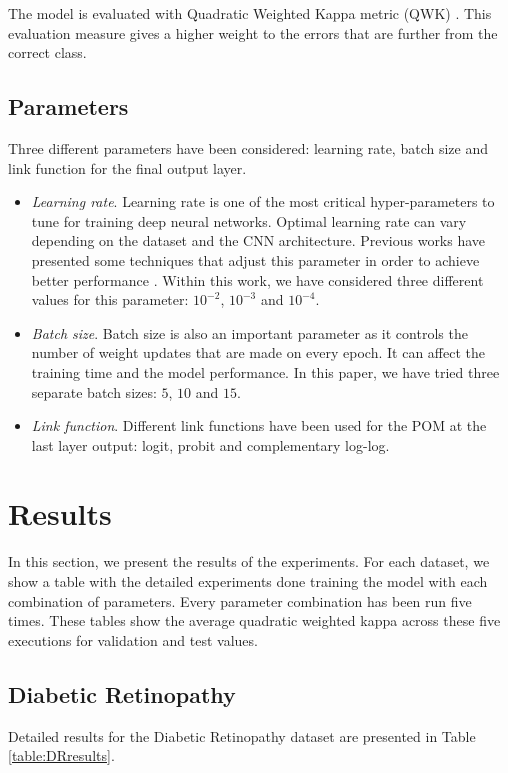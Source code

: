 \documentclass[10pt, a4paper, titlepage, twocolumn]{article}
\begin{document}
	The model is evaluated with Quadratic Weighted Kappa metric (QWK) \cite{ben2008comparison}. This evaluation measure gives a higher weight to the errors that are further from the correct class.
	
	\subsection{Parameters}
	Three different parameters have been considered: learning rate, batch size and link function for the final output layer.
	
	\begin{itemize}
		\item \textit{Learning rate}. Learning rate is one of the most critical hyper-parameters to tune for training deep neural networks. Optimal learning rate can vary depending on the dataset and the CNN architecture. Previous works have presented some techniques that adjust this parameter in order to achieve better performance \cite{smith2017cyclical}\cite{senior2013empirical}. Within this work, we have considered three different values for this parameter: $10^{-2}$, $10^{-3}$ and $10^{-4}$.
		\item \textit{Batch size}. Batch size is also an important parameter as it controls the number of weight updates that are made on every epoch. It can affect the training time and the model performance. In this paper, we have tried three separate batch sizes: $5$, $10$ and $15$.
		\item \textit{Link function}. Different link functions have been used for the POM at the last layer output: logit, probit and complementary log-log.
	\end{itemize}
	
	\section{Results}
	In this section, we present the results of the experiments. For each dataset, we show a table with the detailed experiments done training the model with each combination of parameters. Every parameter combination has been run five times. These tables show the average quadratic weighted kappa across these five executions for validation and test values.
	
	\subsection{Diabetic Retinopathy}
	Detailed results for the Diabetic Retinopathy dataset are presented in Table \ref{table:DRresults}.
	
\end{document}
